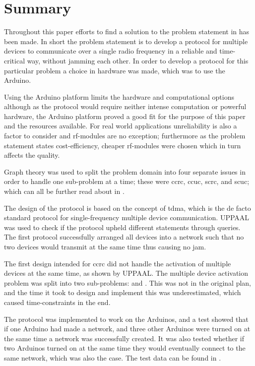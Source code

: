 \section{Summary}\label{cha:conclusion}
Throughout this paper efforts to find a solution to the problem statement in  has been made.
In short the problem statement is to develop a protocol for multiple devices to communicate over a single radio frequency in a reliable and time-critical way, without jamming each other.
In order to develop a protocol for this particular problem a choice in hardware was made, which was to use the Arduino.

Using the Arduino platform limits the hardware and computational options although as the protocol would require neither intense computation or powerful hardware, the Arduino platform proved a good fit for the purpose of this paper and the resources available.
For real world applications unreliability is also a factor to consider and \gls{rf}-modules are no exception; furthermore as the problem statement states cost-efficiency, cheaper \gls{rf}-modules were chosen which in turn affects the quality.

\bigskip \noindent
Graph theory was used to split the problem domain into four separate issues in order to handle one sub-problem at a time; these were \acrfull{ccrc}, \acrfull{ccuc}, \acrfull{scrc}, and \acrfull{scuc}; which can all be further read about in .

The design of the protocol is based on the concept of \acrfull{tdma}, which is the de facto standard protocol for single-frequency multiple device communication.
UPPAAL was used to check if the protocol upheld different statements through queries.
The first protocol successfully arranged all devices into a network such that no two devices would transmit at the same time thus causing no jam.

The first design intended for \acrshort{ccrc} did not handle the activation of multiple devices at the same time, as shown by UPPAAL.
The multiple device activation problem was split into two sub-problems:  and .
This was not in the original plan, and the time it took to design and implement this was underestimated, which caused time-constraints in the end.

The protocol was implemented to work on the Arduinos, and a test showed that if one Arduino had made a network, and three other Arduinos were turned on at the same time a network was successfully created.
It was also tested whether if two Arduinos turned on at the same time they would eventually connect to the same network, which was also the case.
The test data can be found in .

